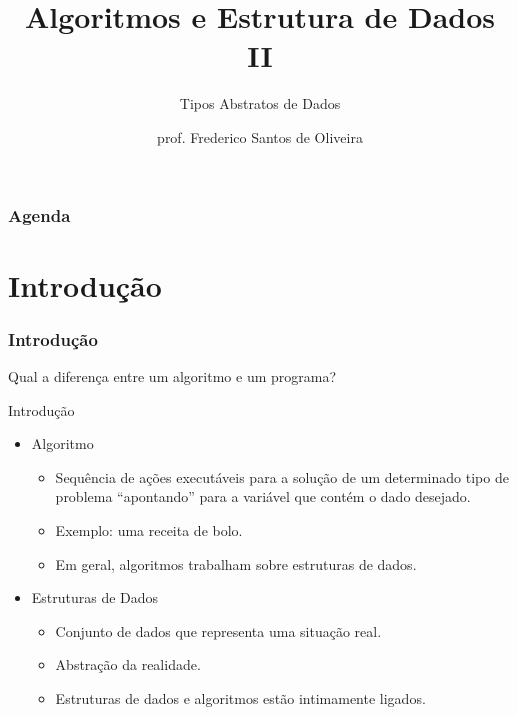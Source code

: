 \documentclass[aspectratio=169]{beamer}
\title[Ponteiros e Alocação Dinâmica]{Algoritmos e Estrutura de Dados II}
\subtitle{Tipos Abstratos de Dados}
\author[Frederico Santos de Oliveira]{prof. Frederico Santos de Oliveira}
\institute[UFMT]{Universidade Federal de Mato Grosso\\ Faculdade de Engenharia}
\date{}
\begin{document}
\begin{frame}[plain]
  \titlepage
\end{frame}



\begin{frame}
  \frametitle{Agenda}
  \tableofcontents
\end{frame}

\section{Introdução}

\begin{frame}
\frametitle{Introdução}
\huge{Qual a diferença entre um algoritmo e um programa?}
\end{frame}


\begin{frame}{Introdução}
\begin{itemize}
\item Algoritmo
\begin{itemize}
\item Sequência de ações executáveis para a solução de um determinado tipo de problema ``apontando'' para a variável que contém o dado desejado.
\item Exemplo: uma receita de bolo.
\item Em geral, algoritmos trabalham sobre estruturas de dados.
\end{itemize}
\item Estruturas de Dados
\begin{itemize}
\item Conjunto de dados que representa uma situação real.
\item Abstração da realidade.
\item Estruturas de dados e algoritmos estão intimamente ligados.
\end{itemize}
\end{itemize}
\end{frame}
\end{document}
